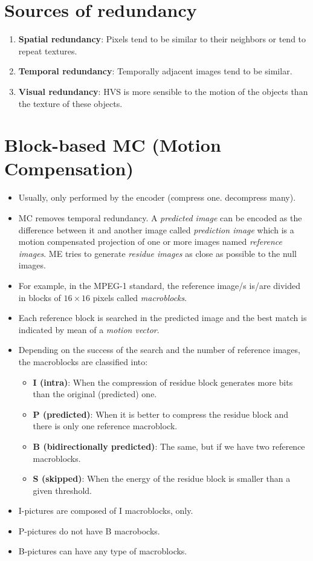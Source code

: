 {\section{Sources of redundancy}
\begin{enumerate}
\item
  \textbf{Spatial redundancy}: Pixels tend to be similar to their
  neighbors or tend to repeat textures.
\item
  \textbf{Temporal redundancy}: Temporally adjacent images tend to be
  similar.
\item
  \textbf{Visual redundancy}: HVS is more sensible to the motion of
  the objects than the texture of these objects.
\end{enumerate}

\section{Block-based MC (Motion Compensation)~\cite{rao1996techniques}}
\begin{itemize}
\tightlist
\item
  Usually, only performed by the encoder (compress one. decompress
  many).
\item
  MC removes temporal redundancy. A \emph{predicted image} can be
  encoded as the difference between it and another image called
  \emph{prediction image} which is a motion compensated projection of
  one or more images named \emph{reference images}. ME tries to generate
  \emph{residue images} as close as possible to the null images.
\item
  For example, in the MPEG-1 standard, the reference image/s is/are
  divided in blocks of $16\times 16$ pixels called \emph{macroblocks}.
\item
  Each reference block is searched in the predicted image and the best
  match is indicated by mean of a \emph{motion vector}.
\item
  Depending on the success of the search and the number of reference
  images, the macroblocks are classified into:

  \begin{itemize}
  \tightlist
  \item
    \textbf{I (intra)}: When the compression of residue block generates
    more bits than the original (predicted) one.
  \item
    \textbf{P (predicted)}: When it is better to compress the residue
    block and there is only one reference macroblock.
  \item
    \textbf{B (bidirectionally predicted)}: The same, but if we have two
    reference macroblocks.
  \item
    \textbf{S (skipped)}: When the energy of the residue block is
    smaller than a given threshold.
  \end{itemize}
\item
  I-pictures are composed of I macroblocks, only.
\item
  P-pictures do not have B macrobocks.
\item
  B-pictures can have any type of macroblocks.
\end{itemize}

}
